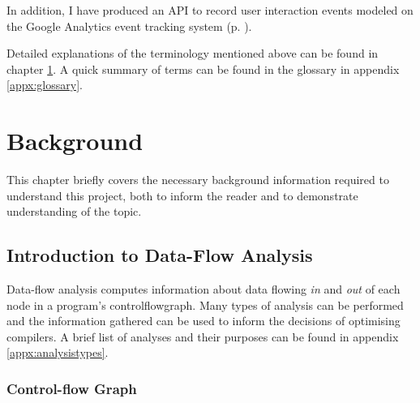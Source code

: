 \documentclass[bsc,twoside,singlespacing,parskip,logo,notimes,normalheadings]{infthesis}
\begin{document}
    In addition, I have produced an API to record user interaction
    events modeled on the Google Analytics event tracking system
    (p. ). %

    Detailed explanations of the terminology mentioned above can be
    found in chapter \ref{chap:background}. A quick summary of terms
    can be found in the glossary in appendix \ref{appx:glossary}.


\chapter{Background}\label{chap:background}
This chapter briefly covers the necessary background information
required to understand this project, both to inform the reader and to
demonstrate understanding of the topic.

    \section{Introduction to Data-Flow Analysis}
    Data-flow analysis computes information about data flowing {\em
      in} and {\em out} of each node in a program's
    \gls{controlflowgraph}. Many types of analysis can be performed
    and the information gathered can be used to inform the decisions
    of optimising compilers. A brief list of analyses and their
    purposes can be found in appendix \ref{appx:analysistypes}.
    
        \subsection{Control-flow Graph}
\end{document}
